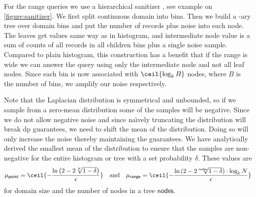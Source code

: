 			For the range queries we use a hierarchical sanitizer \cite{hierarchical-methods-for-dp}, see example on \cref{figure:sanitizer}.
			We first split continuous domain into bins.
			Then we build a \fanout{}-ary tree over domain bins and put the number of records plus noise into each node.
			The leaves get values same way as in histogram, and intermediate node value is a sum of counts of all records in all children bins plus a single noise sample.
			Compared to plain histogram, this construction has a benefit that if the range is wide we can answer the query using only the intermediate node and not all leaf nodes.
			Since each bin is now associated with $\ceil{\log_\fanout B}$ nodes, where $B$ is the number of bins, we amplify our noise respectively.

			Note that the Laplacian distribution is symmetrical and unbounded, so if we sample from a zero-mean distribution some of the samples will be negative.
			Since we do not allow negative noise and since na\"{\i}vely truncating the distribution will break \acrshort{dp} guarantees, we need to shift the mean of the distribution.
			Doing so will only increase the noise thereby maintaining the guarantees.
			We have analytically derived the smallest mean of the distribution to ensure that the samples are non-negative for the entire histogram or tree with a set probability $\delta$.
			These values are
			\[
				\mu_{\mathsf{point}} = \ceil{ -\frac{ \ln \left( 2 - 2 \sqrt[\domainSize]{1 - \delta} \right) }{ \epsilon } } \quad \text{and} \quad \mu_{\mathsf{range}} = \ceil{ -\frac{ \ln{ (2 - 2 \sqrt[\mathsf{nodes}]{ 1 - \delta } ) } \cdot \log_{\fanout} \domainSize }{\epsilon} }
			\]
			for domain size \domainSize{} and the number of nodes in a tree $\mathsf{nodes}$.

